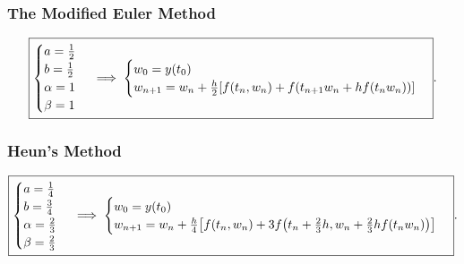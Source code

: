 \subsubsection{The Modified Euler Method}
\begin{equation*}
  \boxed{\begin{cases}
      a = \frac{1}{2} \\
      b = \frac{1}{2} \\
      \alpha = 1 \\
      \beta = 1
    \end{cases}
    \implies 
    \begin{cases}
      w_0 = y(t_0) \\
      w_{n+1} = w_n + \frac{h}{2} \bqty{f(t_n,w_n)+f\pqty{t_{n+1}w_n+hf(t_nw_n)}}
  \end{cases}}
.\end{equation*}

\subsubsection{Heun's Method}
\begin{equation*}
  \boxed{\begin{cases}
      a = \frac{1}{4} \\
      b = \frac{3}{4} \\
      \alpha = \frac{2}{3} \\
      \beta = \frac{2}{3}
    \end{cases}
    \implies 
    \begin{cases}
      w_0 = y(t_0) \\
      w_{n+1} = w_n + \frac{h}{4} \bqty{f(t_n,w_n)+3f\pqty{t_n+\frac{2}{3}h,
      w_n+\frac{2}{3}hf(t_nw_n)}}
  \end{cases}}
.\end{equation*}

